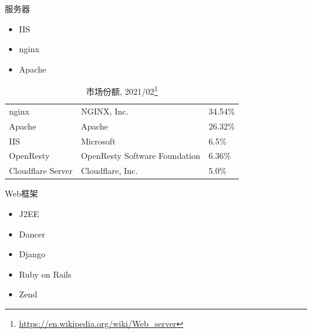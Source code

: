 \documentclass{beamer}
\begin{document}
\begin{frame}[t]{服务器}
\begin{block}{}
\begin{itemize}
\item IIS
\item nginx
\item Apache
\end{itemize}
\end{block}
\begin{table}
    \caption{市场份额, 2021/02\footnote{\url{https://en.wikipedia.org/wiki/Web\_server}}}
    
\begin{tabular}{lll}
    nginx             & NGINX, Inc.                   & 34.54\% \\
    Apache            & Apache                        & 26.32\% \\
    IIS               & Microsoft                     & 6.5\%   \\
    OpenResty         & OpenResty Software Foundation & 6.36\%  \\
    Cloudflare Server & Cloudflare, Inc.              & 5.0\%   \\

\end{tabular}
\end{table}
\end{frame}

\begin{frame}[t]{Web框架}
\begin{block}{}
\begin{itemize}
\item J2EE
\item Dancer
\item Django
\item Ruby on Rails
\item Zend 
\end{itemize}
\end{block}
\end{frame}
\end{document}
